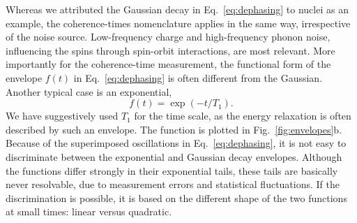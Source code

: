 \documentclass[aps, prx, showpacs, twocolumn, superscriptaddress, notitlepage, longbibliography, floatfix, nofootinbib]{revtex4-2}
\begin{document}
Whereas we attributed the Gaussian decay in Eq.~\eqref{eq:dephasing} to nuclei as an example, the coherence-times nomenclature applies in the same way, irrespective of the noise source. Low-frequency charge and high-frequency phonon noise, influencing the spins through spin-orbit interactions, are most relevant. More importantly for the coherence-time measurement, the functional form of the envelope $f(t)$ in Eq.~\eqref{eq:dephasing} is often different from the Gaussian. Another typical case is an exponential,
\begin{equation}
f(t) = \exp(-t / T_1).
\label{eq:relaxation}
\end{equation}
We have suggestively used $T_1$ for the time scale, as the energy relaxation is often described by such an envelope. The function is plotted in Fig.~\ref{fig:envelopes}b. Because of the superimposed oscillations in Eq.~\eqref{eq:dephasing}, it is not easy to discriminate between the exponential and Gaussian decay envelopes. Although the functions differ strongly in their exponential tails, these tails are basically never resolvable, due to measurement errors and statistical fluctuations. If the discrimination is possible, it is based on the different shape of the two functions at small times: linear versus quadratic.
\end{document}
